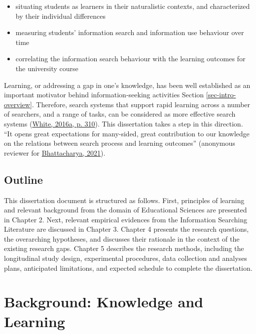 \documentclass[letterpaper, nobind]{templates/ociamthesis}
\providecommand{\tightlist}{%
  \setlength{\itemsep}{0pt}\setlength{\parskip}{0pt}}
\begin{document}
\begin{itemize}
\tightlist
\item
  situating students as learners in their naturalistic contexts, and characterized by their individual differences
\item
  measuring students' information search and information use behaviour over time
\item
  correlating the information search behaviour with the learning outcomes for the university course
\end{itemize}

Learning, or addressing a gap in one's knowledge, has been well established as an important motivator behind information-seeking activities
Section \ref{sec-intro-overview}.
Therefore, search systems that support rapid learning across a number of searchers, and a range of tasks, can be considered as more effective search systems (\protect\hyperlink{ref-white2016interactions}{White, 2016a, p. 310}).
This dissertation takes a step in this direction.
``It opens great expectations for many-sided, great contribution to our knowledge on the relations between search process and learning outcomes'' (anonymous reviewer for \protect\hyperlink{ref-bhattacharya2021longitudinal}{Bhattacharya, 2021}).

\hypertarget{sec-intro-outline}{%
\section{Outline}\label{sec-intro-outline}}

This dissertation document is structured as follows.
First, principles of learning and relevant background from the domain of Educational Sciences are presented in Chapter 2.
Next, relevant empirical evidences from the Information Searching Literature are discussed in Chapter 3.
Chapter 4 presents the research questions, the overarching hypotheses, and discusses their rationale in the context of
the existing research gaps.
Chapter 5 describes the research methods, including the longitudinal study design, experimental procedures, data collection and analyses plans, anticipated limitations, and expected schedule to complete the dissertation.

\hypertarget{ch-bg-learn}{%
\chapter{Background: Knowledge and Learning}\label{ch-bg-learn}}
\end{document}

